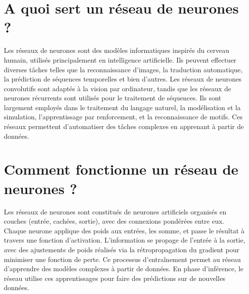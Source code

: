 \documentclass[a0,portrait]{a0poster}
\begin{document}




\color{SaddleBrown} %

\section*{A quoi sert un réseau de neurones ? }

Les réseaux de neurones sont des modèles informatiques inspirés du cerveau humain, utilisés principalement en intelligence artificielle. Ils peuvent effectuer diverses tâches telles que la reconnaissance d'images, la traduction automatique, la prédiction de séquences temporelles et bien d'autres. Les réseaux de neurones convolutifs sont adaptés à la vision par ordinateur, tandis que les réseaux de neurones récurrents sont utilisés pour le traitement de séquences. Ils sont largement employés dans le traitement du langage naturel, la modélisation et la simulation, l'apprentissage par renforcement, et la reconnaissance de motifs. Ces réseaux permettent d'automatiser des tâches complexes en apprenant à partir de données.


\color{DarkSlateGray} %

\section*{Comment fonctionne un réseau de neurones ?}

Les réseaux de neurones sont constitués de neurones artificiels organisés en couches (entrée, cachées, sortie), avec des connexions pondérées entre eux. Chaque neurone applique des poids aux entrées, les somme, et passe le résultat à travers une fonction d'activation. L'information se propage de l'entrée à la sortie, avec des ajustements de poids réalisés via la rétropropagation du gradient pour minimiser une fonction de perte. Ce processus d'entraînement permet au réseau d'apprendre des modèles complexes à partir de données. En phase d'inférence, le réseau utilise ces apprentissages pour faire des prédictions sur de nouvelles données.
\end{document}
